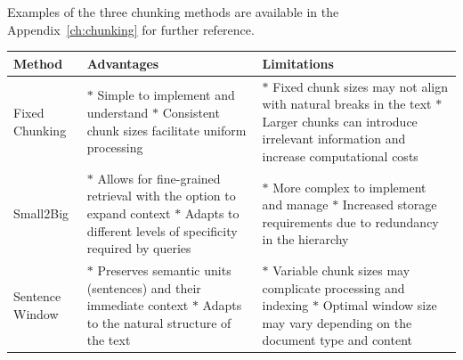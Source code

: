 Examples of the three chunking methods are available in the Appendix~\ref{ch:chunking} for further reference.

\begin{table}[h!]
    \footnotesize
    \caption{Advantages and Limitations of different chunking strategies for RAG systems.}
    \begin{xltabular}{\linewidth}{lXX}
        \toprule
        \textbf{Method} & \textbf{Advantages} & \textbf{Limitations} \\
        \midrule
        Fixed Chunking &
        $\ast$ Simple to implement and understand \newline
        $\ast$ Consistent chunk sizes facilitate uniform processing
        &
        $\ast$ Fixed chunk sizes may not align with natural breaks in the text \newline
        $\ast$ Larger chunks can introduce irrelevant information and increase computational costs
        \\ \hline
        Small2Big &
        $\ast$ Allows for fine-grained retrieval with the option to expand context \newline
        $\ast$ Adapts to different levels of specificity required by queries
        &
        $\ast$ More complex to implement and manage \newline
        $\ast$ Increased storage requirements due to redundancy in the hierarchy
        \\\hline
        Sentence Window &
        $\ast$ Preserves semantic units (sentences) and their immediate context \newline
        $\ast$ Adapts to the natural structure of the text
        &
        $\ast$ Variable chunk sizes may complicate processing and indexing \newline
        $\ast$ Optimal window size may vary depending on the document type and content \\
        \bottomrule
    \end{xltabular}
    \label{tab:window-segmentation-analysis}
\end{table}

